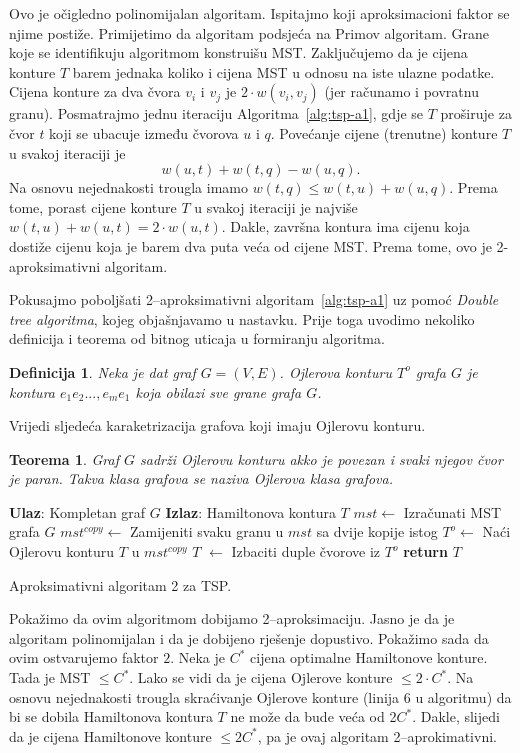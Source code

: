 \documentclass[a4paper, utf8, 11pt, colorlinks]{book}
\newtheorem{definition}{Definicija}
\newtheorem{thm}{Teorema}
\begin{document}
 Ovo je očigledno polinomijalan algoritam. Ispitajmo koji aproksimacioni faktor se 
njime postiže. Primijetimo da algoritam podsjeća na Primov algoritam. Grane koje se identifikuju algoritmom 
konstruišu MST. Zaključujemo da je cijena konture $T$ barem jednaka koliko i cijena MST u odnosu na iste ulazne podatke. Cijena konture za dva čvora $v_i$ i $v_j$ je $2 \cdot w({v_i,v_j})$ (jer računamo i povratnu granu). Posmatrajmo jednu iteraciju Algoritma~\ref{alg:tsp-a1}, gdje se $T$
proširuje za čvor $t$ koji se ubacuje između čvorova  $u$ i $q$. Povećanje cijene (trenutne) konture $T$ u svakoj iteraciji je $$w({u,t}) + w({t,q})-w({u,q}).$$
Na osnovu nejednakosti trougla imamo $ w({t,q}) \leq w({t,u}) + w({u,q})$. Prema tome, porast cijene konture $T$ u svakoj iteraciji je najviše $ w({t, u}) + w({u,t}) = 2\cdot w({u,t})$. 
Dakle, završna kontura ima cijenu koja dostiže cijenu koja je barem dva puta veća od cijene MST. Prema tome, ovo je 2-aproksimativni algoritam. 

 \noindent Pokusajmo poboljšati 2--aproksimativni algoritam~\ref{alg:tsp-a1} uz pomoć \emph{Double tree algoritma}, kojeg objašnjavamo u nastavku. Prije toga uvodimo nekoliko definicija i teorema od bitnog uticaja u formiranju algoritma. 
 \begin{definition}
 	  Neka je dat graf $G=(V,E)$. Ojlerova konturu $T^o$ grafa $G$ je kontura $e_1e_2...,e_me_1$ koja obilazi sve grane grafa $G$. 
 \end{definition}
Vrijedi sljedeća karaketrizacija grafova koji imaju Ojlerovu konturu. 
\begin{thm}
	 Graf $G$ sadrži Ojlerovu konturu akko je povezan i svaki njegov čvor je paran. Takva klasa grafova se naziva Ojlerova klasa grafova.
\end{thm}

\begin{algorithm}[H] 
	\begin{algorithmic}[1]
		\STATE \textbf{Ulaz}: Kompletan graf $G$
		\STATE \textbf{Izlaz}: Hamiltonova kontura $T$   
		\STATE $mst \gets$  Izračunati MST grafa $G$
		\STATE $mst^{copy} \gets$ Zamijeniti svaku granu u $mst$ sa dvije kopije istog
		\STATE $T^o \gets$ Naći Ojlerovu konturu $T$ u $mst^{copy}$
		\STATE   $T$ $\gets$ Izbaciti duple čvorove iz $T^o$   
		\STATE \textbf{return} $T$ 
	\end{algorithmic}
   	\caption{Aproksimativni algoritam 2 za TSP.}
   	\label{alg:tsp-a2}
\end{algorithm}
  Pokažimo da ovim algoritmom dobijamo 2--aproksimaciju. Jasno je da je algoritam polinomijalan i da je dobijeno rješenje dopustivo. Pokažimo sada da ovim ostvarujemo faktor $2$.  
  Neka je $C^*$ cijena optimalne Hamiltonove konture. Tada je MST $\leq C^*$. 
  Lako se vidi da je cijena Ojlerove konture  $\leq 2 \cdot C^*$. Na osnovu nejednakosti trougla skraćivanje Ojlerove konture (linija 6 u algoritmu) da bi se dobila Hamiltonova kontura $T$ ne može da bude veća od 2$C^*$. Dakle, slijedi da je cijena Hamiltonove konture $\leq 2 C^*$, pa je ovaj algoritam 2--aprokimativni.
  
\end{document}
